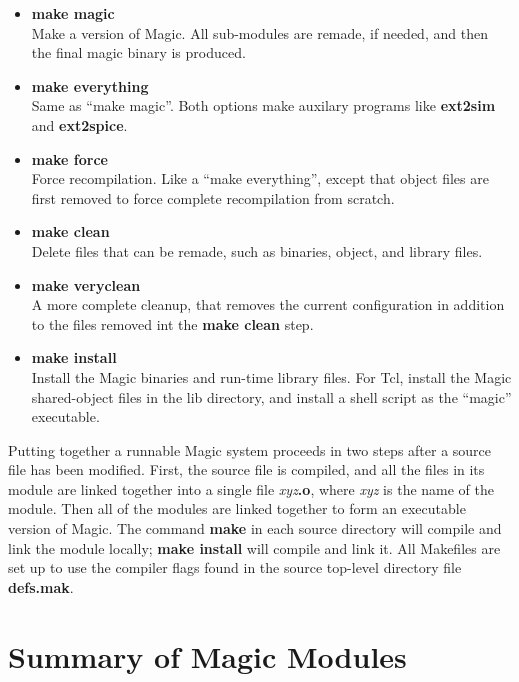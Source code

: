 \documentclass[letterpaper,twoside,12pt]{article}
\begin{document}
\begin{itemize}
\item {\bfseries make magic} \\
	Make a version of Magic.  All sub-modules are remade, if needed, 
	and then the final magic binary is produced.

\item {\bfseries make everything} \\
	Same as ``make magic''. Both options make auxilary programs like
	{\bfseries ext2sim} and {\bfseries ext2spice}.

\item {\bfseries make force} \\
	Force recompilation.  Like a ``make everything'', except that object
	files are first removed to force complete recompilation from scratch.

\item {\bfseries make clean} \\
	Delete files that can be remade, such as binaries, object, and
	library files.

\item {\bfseries make veryclean} \\
	A more complete cleanup, that removes the current configuration
	in addition to the files removed int the {\bfseries make clean}
	step.

\item {\bfseries make install} \\
	Install the Magic binaries and run-time library files.
	For Tcl, install the Magic shared-object files in the lib
	directory, and install a shell script as the ``magic''
	executable.
\end{itemize}

Putting together a runnable Magic system proceeds in two steps
after a source file has been modified.  First, the source file
is compiled, and all the files in its module are linked together
into a single file {\itshape xyz}{\bfseries .o}, where {\itshape xyz}
is the name of the module.  Then all of the modules are linked together
to form an executable version of Magic.
The command {\bfseries make} in each source directory will compile and
link the module locally;  {\bfseries make install} will compile and
link it.  All Makefiles are set up to use the compiler flags found 
in the source top-level directory file {\bfseries defs.mak}.

\section{Summary of Magic Modules} \label{modules}
\end{document}
